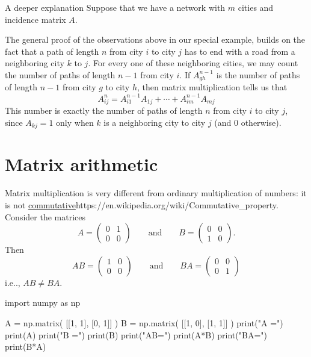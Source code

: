 \documentclass{article}
\begin{document}
\begin{example}
\begin{hideinbutton}{A deeper explanation}
Suppose that we have a network with $m$ cities and incidence matrix $A$.

The general proof of the observations above in our special example, builds on the
fact that 
a path of length $n$ from city $i$ to city $j$ has to end with a road from a neighboring city
$k$ to $j$.
For every one of these neighboring cities, we may count the number of paths of length $n-1$
from city $i$.
If $A^{n-1}_{gh}$ is the number of paths of length $n-1$ from city $g$ to city $h$,
then matrix multiplication tells us that 
$$
A^n_{i j} = A^{n-1}_{i 1} A_{1 j} + \cdots + A^{n-1}_{i m} A_{m j} 
$$
This number is exactly the number of paths of length $n$ from city $i$ to
city $j$, since 
$A_{k j} = 1$ only when $k$ is a neighboring city to city $j$ (and $0$ otherwise).
\end{hideinbutton}
\end{example}

\section{Matrix arithmetic}

Matrix multiplication is very different from ordinary multiplication of numbers:
it is not \url{commutative}{https://en.wikipedia.org/wiki/Commutative_property}.
Consider the matrices
$$
A=
\begin{pmatrix}
0 & 1\\
0 & 0
\end{pmatrix}\qquad\text{and}\qquad
B = 
\begin{pmatrix}
0 & 0\\
1 & 0
\end{pmatrix}.
$$
Then
$$
A B = \begin{pmatrix} 1 & 0 \\ 0 & 0\end{pmatrix}\qquad \text{and} \qquad 
B A = \begin{pmatrix} 0 & 0 \\ 0 & 1\end{pmatrix}
$$
i.e.., $A B \neq B A$. 

\begin{sage}
import numpy as np
  
A = np.matrix( [[1, 1], [0, 1]] )
B = np.matrix( [[1, 0], [1, 1]] )
print("A =")
print(A)
print("B =")
print(B)
print("AB=")
print(A*B)
print("BA=")
print(B*A)
\end{sage}
\end{document}
